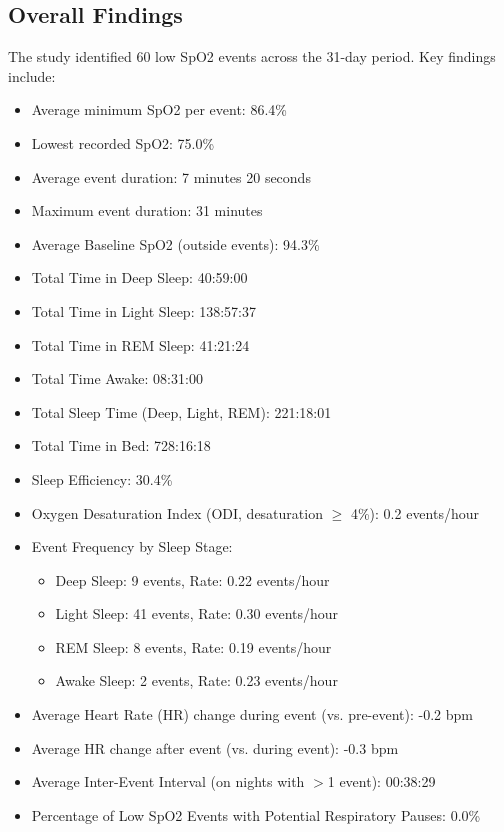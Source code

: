 \documentclass{article}
\begin{document}
\subsection{Overall Findings}
The study identified 60 low SpO2 events across the 31-day period. Key findings include:
\begin{itemize}
    \item Average minimum SpO2 per event: 86.4\%
    \item Lowest recorded SpO2: 75.0\%
    \item Average event duration: 7 minutes 20 seconds
    \item Maximum event duration: 31 minutes
    \item Average Baseline SpO2 (outside events): 94.3\%
    \item Total Time in Deep Sleep: 40:59:00
    \item Total Time in Light Sleep: 138:57:37
    \item Total Time in REM Sleep: 41:21:24
    \item Total Time Awake: 08:31:00
    \item Total Sleep Time (Deep, Light, REM): 221:18:01
    \item Total Time in Bed: 728:16:18
    \item Sleep Efficiency: 30.4\%
    \item Oxygen Desaturation Index (ODI, desaturation $\ge$ 4\%): 0.2 events/hour
    \item Event Frequency by Sleep Stage:
    \begin{itemize}
        \item Deep Sleep: 9 events, Rate: 0.22 events/hour
        \item Light Sleep: 41 events, Rate: 0.30 events/hour
        \item REM Sleep: 8 events, Rate: 0.19 events/hour
        \item Awake Sleep: 2 events, Rate: 0.23 events/hour
    \end{itemize}
    \item Average Heart Rate (HR) change during event (vs. pre-event): -0.2 bpm
    \item Average HR change after event (vs. during event): -0.3 bpm
    \item Average Inter-Event Interval (on nights with $>$1 event): 00:38:29
    \item Percentage of Low SpO2 Events with Potential Respiratory Pauses: 0.0\%
\end{itemize}
\end{document}
